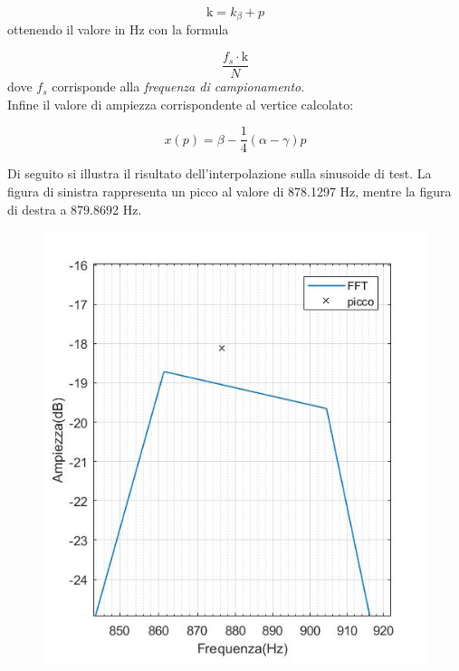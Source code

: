\documentclass[12pt]{report}
\begin{document}
$$ \mbox{\^{k}} = k_\beta + p $$
ottenendo il valore in Hz con la formula 

$$ \frac{f_s\cdot \mbox{\^{k}}}{N}$$
dove $f_s$ corrisponde alla {\itshape frequenza di campionamento}.\\
Infine il valore di ampiezza corrispondente al vertice calcolato:

$$ x(p) = \beta - \frac{1}{4}(\alpha - \gamma)p  $$

Di seguito si illustra il risultato dell'interpolazione sulla sinusoide di test. La figura di sinistra rappresenta un picco al valore di 878.1297 Hz, mentre la figura di destra a 879.8692 Hz.

\begin{figure}[htbp]  \centering 
	\begin{minipage}[c]{.40\textwidth} 
		\centering
		\includegraphics[width= 1.14 \textwidth]{img/1024peak_parab} 
	\end{minipage}%
	\hspace{10mm}%
	\begin{minipage}[c]{.40\textwidth} 
		\centering

\end{minipage}
\end{figure}
\end{document}
